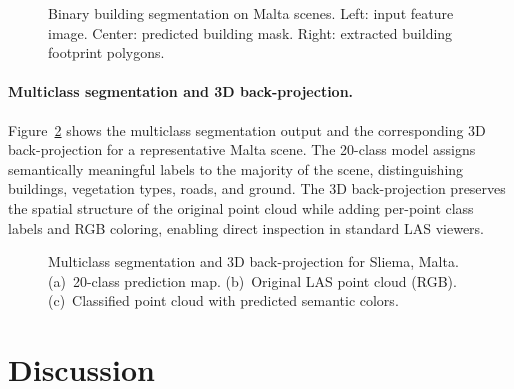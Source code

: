 \documentclass[11pt]{article}
\begin{document}
\begin{figure}[t]
    \centering
    \caption{Binary building segmentation on Malta scenes. Left: input feature image. Center: predicted building mask. Right: extracted building footprint polygons.}
    \label{fig:building_seg}
\end{figure}

\paragraph{Multiclass segmentation and 3D back-projection.}
Figure~\ref{fig:multiclass_3d} shows the multiclass segmentation output and the corresponding 3D back-projection for a representative Malta scene.
The 20-class model assigns semantically meaningful labels to the majority of the scene, distinguishing buildings, vegetation types, roads, and ground.
The 3D back-projection preserves the spatial structure of the original point cloud while adding per-point class labels and RGB coloring, enabling direct inspection in standard LAS viewers.

\begin{figure}[t]
    \centering
    \caption{Multiclass segmentation and 3D back-projection for Sliema, Malta. (a)~20-class prediction map. (b)~Original LAS point cloud (RGB). (c)~Classified point cloud with predicted semantic colors.}
    \label{fig:multiclass_3d}
\end{figure}

\section{Discussion}
\label{sec:discussion}
\end{document}
